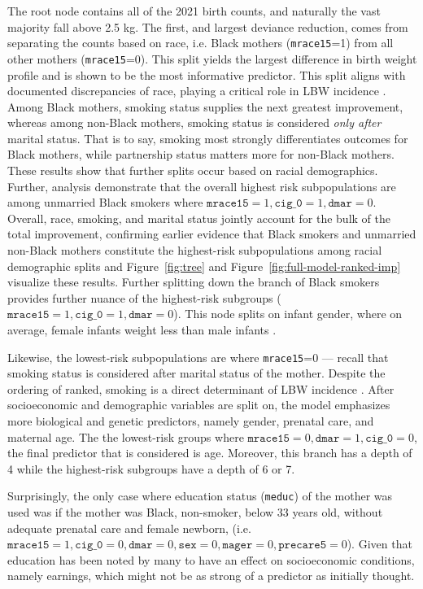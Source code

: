 The root node contains all of the 2021 birth counts, and naturally the vast majority fall above 2.5 kg. The first, and largest deviance reduction, comes from separating the counts based on race, i.e. Black mothers (\texttt{mrace15}=1) from all other mothers (\texttt{mrace15}=0). This split yields the largest difference in birth weight profile and is shown to be the most informative predictor. This split aligns with documented discrepancies of race, playing a critical role in LBW incidence \parencite{kff_maternal_infant_health_a, pmc1751798}. Among Black mothers, smoking status supplies the next greatest improvement, whereas among non-Black mothers, smoking status is considered \emph{only after} marital status. That is to say, smoking most strongly differentiates outcomes for Black mothers, while partnership status matters more for non-Black mothers. These results show that further splits occur based on racial demographics. Further, analysis demonstrate that the overall highest risk subpopulations are among unmarried Black smokers   where \(\texttt{mrace15}=1,\texttt{cig\_0}=1, \texttt{dmar}=0\). Overall, race, smoking, and marital status jointly account for the bulk of the total improvement, confirming earlier evidence that Black smokers and unmarried non-Black mothers constitute the highest-risk subpopulations among racial demographic splits \parencite{kff_maternal_infant_health_a,pmc1751798, smoking_lbw} and Figure~\ref{fig:tree} and Figure~\ref{fig:full-model-ranked-imp} visualize these results. Further splitting down the branch of Black smokers provides further nuance of the highest-risk subgroups (\(\texttt{mrace15}=1,\texttt{cig\_0}=1, \texttt{dmar}=0\)). This node splits on infant gender, where on average, female infants weight less than male infants \parencite{decreasing_sex_diff_birth_weight2009}. 

Likewise, the lowest-risk subpopulations are where \texttt{mrace15}=0 — recall that smoking status is considered after marital status of the mother. Despite the ordering of ranked, smoking is a direct determinant of LBW incidence \parencite{smoking_lbw}. After socioeconomic and demographic variables are split on, the model emphasizes more biological and genetic predictors, namely gender, prenatal care, and maternal age. The the lowest-risk groups where \(\texttt{mrace15}=0, \texttt{dmar}=1,\texttt{cig\_0}=0\), the final predictor that is considered is age. Moreover, this branch has a depth of 4 while the highest-risk subgroups have a depth of 6 or 7. 

Surprisingly, the only case where education status (\texttt{meduc}) of the mother was used was if the mother was Black, non-smoker, below 33 years old, without adequate prenatal care and female newborn, (i.e. \(\texttt{mrace15} = 1, \texttt{cig\_0} = 0,\texttt{dmar}=0, \texttt{sex}=0, \texttt{mager}=0,\texttt{precare5}=0\)). Given that education has been noted by many \parencite{edu_lbw} to have an effect on socioeconomic conditions, namely earnings, which might not be as strong of a predictor as initially thought.

